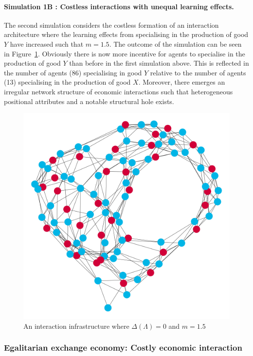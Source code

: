 \paragraph{Simulation 1B : Costless interactions with unequal learning effects.}

The second simulation considers the costless formation of an interaction architecture where the learning effects from specialising in the production of good $Y$ have increased such that $m = 1.5$. The outcome of the simulation can be seen in Figure~\ref{Sim2}. Obviously there is now more incentive for agents to specialise in the production of good $Y$ than before in the first simulation above. This is reflected in the number of agents (86) specialising in good $Y$ relative to the number of agents (13) specialising in the production of good $X$. Moreover, there emerges an irregular network structure of economic interactions such that heterogeneous positional attributes and a notable structural hole exists.

\begin{figure}[t]
\centering
\includegraphics[scale=0.22]{imgs/Sim2E.png}
\caption{An interaction infrastructure where $\Delta(\Lambda)=0$ and $m=1.5$}
\label{Sim2}
\end{figure}

\subsubsection{Egalitarian exchange economy: Costly economic interaction}

